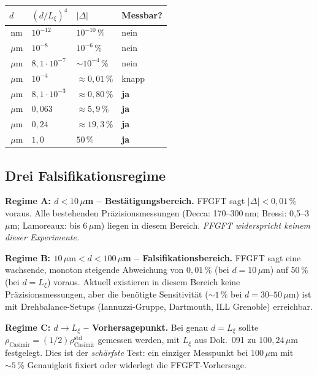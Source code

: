 \begin{center}
\renewcommand{\arraystretch}{1.3}
{\small
\begin{tabular}{>{\raggedright\arraybackslash}p{1.6cm}>{\raggedright\arraybackslash}p{1.8cm}>{\raggedright\arraybackslash}p{2.4cm}>{\raggedright\arraybackslash}p{2.4cm}}
\toprule
\textbf{$d$} & $(d/L_\xi)^4$ & \textbf{$|\Delta|$} & \textbf{Messbar?} \\
\midrule
100\,nm     & $10^{-12}$              & $10^{-10}\,\%$    & nein \\
1\,$\mu$m   & $10^{-8}$               & $10^{-6}\,\%$     & nein \\
3\,$\mu$m   & $8{,}1\!\cdot\!10^{-7}$ & $\sim 10^{-4}\,\%$ & nein \\
10\,$\mu$m  & $10^{-4}$               & $\approx 0{,}01\,\%$ & knapp \\
30\,$\mu$m  & $8{,}1\!\cdot\!10^{-3}$ & $\approx 0{,}80\,\%$ & \textbf{ja} \\
50\,$\mu$m  & $0{,}063$               & $\approx 5{,}9\,\%$ & \textbf{ja} \\
70\,$\mu$m  & $0{,}24$                & $\approx 19{,}3\,\%$ & \textbf{ja} \\
100\,$\mu$m & $1{,}0$                 & $50\,\%$          & \textbf{ja} \\
\bottomrule
\end{tabular}
}
\renewcommand{\arraystretch}{1.0}
\end{center}

\subsection{Drei Falsifikationsregime}

\textbf{Regime A: $d < 10\,\mu$m -- Bestätigungsbereich.}
FFGFT sagt $|\Delta| < 0{,}01\,\%$ voraus. Alle bestehenden
Präzisionsmessungen (Decca: 170--300\,nm; Bressi: 0{,}5--3\,$\mu$m;
Lamoreaux: bis 6\,$\mu$m) liegen in diesem Bereich. \emph{FFGFT
widerspricht keinem dieser Experimente.}

\textbf{Regime B: $10\,\mu\text{m} < d < 100\,\mu$m -- Falsifikationsbereich.}
FFGFT sagt eine wachsende, monoton steigende Abweichung von $0{,}01\,\%$
(bei $d=10\,\mu$m) auf $50\,\%$ (bei $d=L_\xi$) voraus. Aktuell
existieren in diesem Bereich keine Präzisionsmessungen, aber die
benötigte Sensitivität ($\sim 1\,\%$ bei $d=30$--$50\,\mu$m) ist mit
Drehbalance-Setups (Iannuzzi-Gruppe, Dartmouth, ILL Grenoble)
erreichbar.

\textbf{Regime C: $d \to L_\xi$ -- Vorhersagepunkt.}
Bei genau $d = L_\xi$ sollte $\rho_\text{Casimir} = (1/2)\rho_\text{Casimir}^\text{std}$
gemessen werden, mit $L_\xi$ aus Dok.~091 zu $100{,}24\,\mu$m
festgelegt. Dies ist der \emph{schärfste} Test: ein einziger
Messpunkt bei $100\,\mu$m mit $\sim 5\,\%$ Genauigkeit fixiert oder
widerlegt die FFGFT-Vorhersage.

